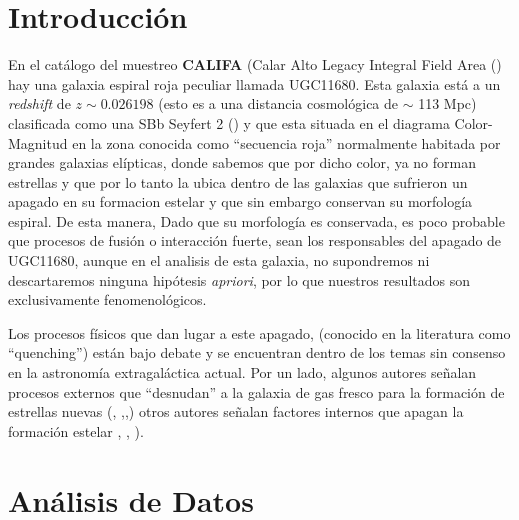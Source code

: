 \documentclass[12pt]{article}
\begin{document}
\maketitle



\section{Introducción}

En el catálogo del muestreo \textbf{CALIFA} (Calar Alto Legacy Integral Field Area (\cite{sanchez2012}) hay una galaxia espiral roja peculiar llamada UGC11680. Esta galaxia está a un  \textsl{redshift} de $z \sim 0.026198$ (esto es a una distancia cosmológica de $\sim$ 113 Mpc)  clasificada como una SBb Seyfert 2 (\cite{blazquez2007}) y que esta situada en el diagrama Color-Magnitud en la zona conocida como ``secuencia roja'' normalmente habitada por grandes galaxias elípticas, donde sabemos que por dicho color, ya no forman estrellas y que por lo tanto la ubica dentro de las galaxias que sufrieron un apagado en su formacion estelar y que sin embargo conservan su morfología espiral. De esta manera, Dado que su morfología es conservada, es poco probable que procesos de fusión o interacción fuerte, sean los responsables del apagado de UGC11680, aunque en el analisis de esta galaxia, no supondremos ni descartaremos ninguna hipótesis \textsl{apriori}, por lo que nuestros resultados son exclusivamente fenomenológicos. 

\noindent Los procesos físicos que dan lugar a este apagado, (conocido en la literatura como ``quenching'') están bajo debate y se encuentran dentro de los temas sin consenso  en la astronomía extragaláctica actual. Por un lado, algunos autores señalan procesos externos que  ``desnudan'' a la galaxia de gas fresco para la formación de estrellas nuevas  (\cite{salim2007}, \cite{noeske2007},\cite{peng2010},\cite{dimatteo2005}) otros autores señalan factores internos que apagan la formación estelar \cite{martin2007}, \cite{nandra2007}, \cite{schawinski2007}).

\section{Análisis de Datos}
\end{document}
